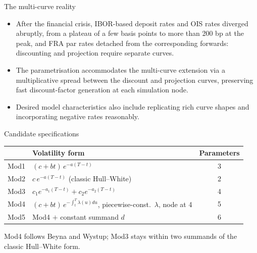 \documentclass[aspectratio=169,11pt]{beamer}
\begin{document}
\begin{frame}{The multi-curve reality}
  \begin{itemize}
    \item After the financial crisis, IBOR-based deposit rates and OIS
          rates diverged abruptly, from a plateau of a few basis points to
          more than 200 bp at the peak, and FRA par rates detached from the
          corresponding forwards: discounting and projection require
          separate curves.
    \item The parametrisation accommodates the multi-curve extension via a
          multiplicative spread between the discount and projection curves,
          preserving fast discount-factor generation at each simulation
          node.
    \item Desired model characteristics also include replicating rich curve
          shapes and incorporating negative rates reasonably.
  \end{itemize}
\end{frame}

\begin{frame}{Candidate specifications}
  \small
  \begin{center}
  \begin{tabular}{llc}
    \toprule
    & Volatility form & Parameters \\
    \midrule
    Mod1 & $(c+bt)\,e^{-a(T-t)}$ & 3 \\
    Mod2 & $c\,e^{-a(T-t)}$ (classic Hull--White) & 2 \\
    Mod3 & $c_1 e^{-a_1(T-t)} + c_2 e^{-a_2(T-t)}$ & 4 \\
    Mod4 & $(c+bt)\,e^{-\int_t^{T}\lambda(u)du}$, piecewise-const.\ $\lambda$, node at 4 & 5 \\
    Mod5 & Mod4 $+$ constant summand $d$ & 6 \\
    \bottomrule
  \end{tabular}
  \end{center}
  \vspace{2mm}
  Mod4 follows Beyna and Wystup; Mod3 stays within two summands of the
  classic Hull--White form.
\end{frame}
\end{document}
